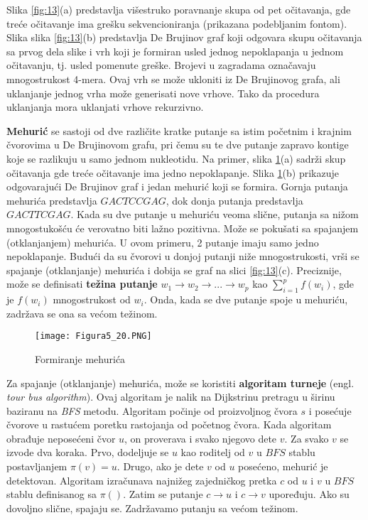 \documentclass[12pt,oneside]{memoir}
\begin{document}
Slika \ref{fig:13}(a) predstavlja višestruko poravnanje skupa od pet očitavanja, gde treće očitavanje ima grešku sekvencioniranja (prikazana podebljanim fontom). Slika slika \ref{fig:13}(b) predstavlja De Brujinov graf koji odgovara skupu očitavanja sa prvog dela slike i vrh koji je formiran usled jednog nepoklapanja u jednom očitavanju, tj. usled pomenute greške. Brojevi u zagradama označavaju mnogostrukost 4-mera. Ovaj vrh se može ukloniti iz De Brujinovog grafa, ali uklanjanje jednog vrha može generisati nove vrhove. Tako da procedura uklanjanja mora uklanjati vrhove rekurzivno.

\textbf{Mehurić} se sastoji od dve različite kratke putanje sa istim početnim i
krajnim čvorovima u De Brujinovom grafu, pri čemu su te dve putanje zapravo kontige koje se razlikuju u samo jednom nukleotidu. Na primer, slika \ref{fig:133}(a) sadrži skup očitavanja gde treće očitavanje ima jedno nepoklapanje. Slika \ref{fig:133}(b) prikazuje odgovarajući De Brujinov graf i jedan mehurić koji se formira. Gornja putanja mehurića predstavlja $GACTCCGAG$, dok donja putanja predstavlja $GACTTCGAG$. Kada su dve putanje u mehuriću veoma slične, putanja sa nižom mnogostukošću će verovatno biti lažno pozitivna. Može se pokušati sa spajanjem (otklanjanjem) mehurića. U ovom primeru, 2 putanje imaju samo jedno nepoklapanje. Budući da su čvorovi u donjoj putanji niže mnogostrukosti, vrši se spajanje (otklanjanje) mehurića i dobija se graf na slici \ref{fig:13}(c). Preciznije, može se definisati \textbf{težina putanje} $w_1 \rightarrow w_2 \rightarrow ... \rightarrow w_p$ kao $\sum_{i=1}^{p} f(w_i)$, gde je $f(w_i)$ mnogostrukost od $w_i$. Onda, kada se dve putanje spoje u mehuriću, zadržava se ona sa većom težinom.

\begin{figure}[!ht]
\centering
\texttt{[image: Figura5\_20.PNG]}
\caption{Formiranje mehurića}
\label{fig:133}
\end{figure}

Za spajanje (otklanjanje) mehurića, može se koristiti \textbf{algoritam turneje} (engl. \textit{tour bus algorithm}). Ovaj algoritam je nalik na Dijkstrinu pretragu u širinu baziranu na \textit{BFS} metodu. Algoritam počinje od proizvoljnog čvora $s$ i posećuje čvorove u rastućem poretku rastojanja od početnog čvora. Kada algoritam obrađuje neposećeni čvor $u$, on proverava i svako njegovo dete $v$. Za svako $v$ se izvode dva koraka. Prvo, dodeljuje se $u$ kao roditelj od $v$ u $BFS$ stablu postavljanjem $\pi (v) = u$. Drugo, ako je dete $v$ od $u$ posećeno, mehurić je detektovan. Algoritam izračunava najnižeg zajedničkog pretka $c$ od $u$ i $v$ u $BFS$ stablu definisanog sa $\pi ()$. Zatim se putanje $c \rightarrow u$ i $c \rightarrow v$ upoređuju. Ako su dovoljno slične, spajaju se. Zadržavamo putanju sa većom težinom.
\end{document}
